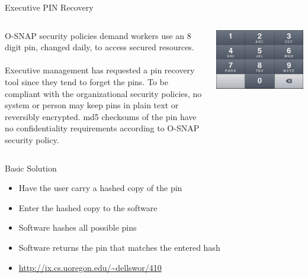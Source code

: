 \documentclass[xcolor=dvipsnames]{beamer}
\begin{document}
	\begin{frame}{Executive PIN Recovery}
		\begin{columns}
			\begin{column}{0.5\textwidth}
					O-SNAP security policies demand workers use an 8 digit pin, changed daily, to 
					access secured resources. \\~\\
					Executive management has requested a pin recovery tool since they tend to forget 
					the pins. To be compliant with the organizational security policies, no system or 
					person may keep pins in plain text or reversibly encrypted. md5 checksums of the 
					pin have no confidentiality requirements according to O-SNAP security policy.
			\end{column}
			\begin{column}{0.5\textwidth}
				\includegraphics[width=\textwidth]{images/keypad}
			\end{column}
		\end{columns}
	\end{frame}
	
	\begin{frame}{Basic Solution}
		\begin{itemize}
			\item Have the user carry a hashed copy of the pin
			\item Enter the hashed copy to the software
			\item Software hashes all possible pins
			\item Software returns the pin that matches the entered hash
			\item \href{http://ix.cs.uoregon.edu/~dellswor/410}{\url{http://ix.cs.uoregon.edu/~dellswor/410}}
		\end{itemize}
	\end{frame}
	
\end{document}
